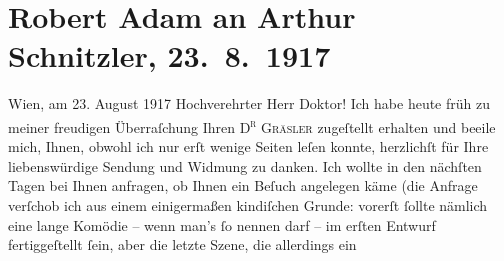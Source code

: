 

         
         \renewcommand{\erwaehntePersonen}{Personen: Robert Adam}
         \renewcommand{\erwaehnteOrte}{Orte: Wien}
         \renewcommand{\erwaehnteWerke}{Werke: Das Ende des Judas, Doktor Gräsler, Badearzt, Don Quijote}
               \section[Robert Adam an Arthur Schnitzler, 23. 8. 1917]{ Robert Adam an Arthur Schnitzler, 23. 8. 1917}\nopagebreak{}\rehead{ }\begin{ledgroupsized}[t]{13cm}\normalsize\beginnumbering \toendnotes[C]{\smallbreak\pagebreak[2]} 
\toendnotes[C]{\smallbreak}\pstart
           \raggedleft{}{\pb}Wien, am 23. August 1917\pend
           \pstart{}Hochverehrter Herr Doktor!\pend\pstart
           Ich habe heute früh zu meiner freudigen Überraſchung Ihren \textsc{D\textsuperscript{r}{ }Gräsler} zugeſtellt erhalten und beeile mich, Ihnen, obwohl ich nur erſt wenige Seiten
               leſen konnte, herzlichſt für Ihre liebenswürdige Sendung und Widmung zu danken.\pend
           \pstart
           Ich wollte in den nächſten Tagen bei Ihnen anfragen, ob Ihnen ein Beſuch angelegen
               käme (die Anfrage verſchob ich aus einem einigermaßen kindiſchen Grunde: vorerſt
               ſollte nämlich eine lange Komödie – wenn man’s ſo  nennen darf – im
               erſten Entwurf fertiggeſtellt ſein, aber die letzte Szene, die allerdings ein

\end{ledgroupsized}
